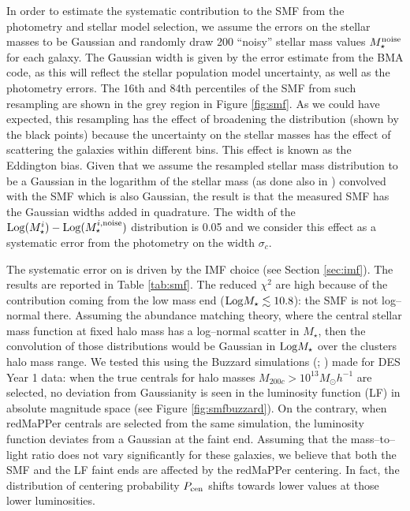 {In order to estimate the systematic contribution to the SMF from the photometry and stellar model selection, we assume the errors on the stellar masses to be Gaussian and randomly draw 200 ``noisy'' stellar mass values $M_\star^{\rm noise}$ for each galaxy. The Gaussian width is given by the error estimate from the BMA code, as this will reflect the stellar population model uncertainty, as well as the photometry errors. The 16th and 84th percentiles of the SMF from such resampling are shown in the grey region in Figure \ref{fig:smf}. As we could have expected, this resampling has the effect of broadening the distribution (shown by the black points) because the uncertainty on the stellar masses has the effect of scattering the galaxies within different bins. This effect is known as the Eddington bias. Given that we assume the resampled stellar mass distribution to be a Gaussian in the logarithm of the stellar mass (as done also in \citealt{caputi}) convolved with the SMF which is also Gaussian, the result is that the measured SMF has the Gaussian widths added in quadrature. The width of the ${\rm Log}(M^i_\star)-{\rm Log}(M_\star^{i,{\rm noise}})$ distribution is 0.05 and we consider this effect as a systematic error from the photometry on the width $\sigma_c$.

The systematic error on  is driven by the IMF choice (see Section \ref{sec:imf}). The results are reported in Table \ref{tab:smf}. The reduced $\chi^2$ are high because of the contribution coming from the low mass end (${\rm Log}M_\star\lesssim 10.8$): the SMF is not log--normal there. Assuming the abundance matching theory, where the central stellar mass function at fixed halo mass has a log--normal scatter in $M_\star$, then the convolution of those distributions would be Gaussian in ${\rm Log} M_\star$ over the clusters halo mass range. We tested this using the Buzzard simulations (\citealt{derose}; \citealt{wechsler}) made for DES Year 1 data: when the true centrals for halo masses $M_{200c}>10^{13} M_\odot h^{-1}$ are selected, no deviation from Gaussianity is seen in the luminosity function (LF) in absolute magnitude space (see Figure \ref{fig:smfbuzzard}). On the contrary, when redMaPPer centrals are selected from the same simulation, the luminosity function deviates from a Gaussian at the faint end. Assuming that the mass--to--light ratio does not vary significantly for these galaxies, we believe that both the SMF and the LF faint ends are affected by the redMaPPer centering. In fact, the distribution of centering probability $P_{\rm cen}$ shifts towards lower values at those lower luminosities.

}
